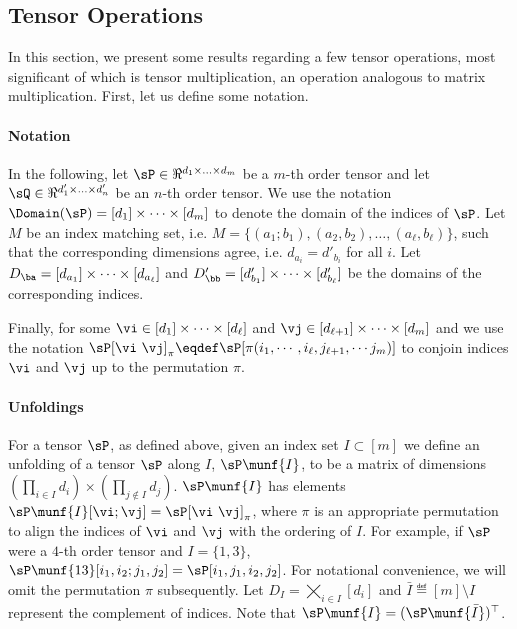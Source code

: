 \subsection{Tensor Operations}
\label{app:tensor-multiplication}

In this section, we present some results regarding a few tensor
operations, most significant of which is tensor multiplication, an
operation analogous to matrix multiplication.  
First, let us define some notation.

\paragraph{Notation}
In the following, let $\sP \in \Re^{d_1 \times \ldots \times d_m}$ be
  a $m$-th order tensor and let $\sQ \in \Re^{d'_1 \times \ldots \times
  d'_n}$ be an $n$-th order tensor. %
We use the notation $\Domain(\sP) = [d_1] \times \cdots \times [d_m]$
  to denote the domain of the indices of $\sP$.
Let $M$ be an index matching set, i.e. $M = \{ (a_1; b_1),
  (a_2, b_2), \ldots, (a_\ell, b_\ell) \}$, such that the corresponding
  dimensions agree, i.e. $d_{a_i} = d'_{b_i}$ for all $i$. Let $D_{\ba}
  = [d_{a_1}] \times \cdots \times [d_{a_\ell}]$ and $D'_{\bb}
  = [d'_{b_1}] \times \cdots \times [d'_{b_\ell}]$ be the domains of the
  corresponding indices.

Finally, for some $\vi \in [d_1] \times \cdots \times [d_\ell]$ and $\vj
\in [d_{\ell + 1}] \times \cdots \times [d_m]$ and  we use the notation
$\sP[\vi \ \vj]_\pi \eqdef \sP[\pi(i_1, \cdots, i_\ell, j_{\ell+1},
\cdots j_m)]$ to conjoin indices $\vi$ and $\vj$ up to the permutation
$\pi$. 

\paragraph{Unfoldings}
For a tensor $\sP$, as defined above, 
  given an index set $I \subset [m]$ we
  define an unfolding of a tensor $\sP$ along $I$,
 $\sP\munf{I}$, to be a matrix of dimensions $(\prod_{i \in I} d_i)
 \times (\prod_{j \not\in I} d_j)$. $\sP\munf{I}$ has elements
 $\sP\munf{I}[\vi;\vj] = \sP[\vi\ \vj]_{\pi}$, where $\pi$ is an
 appropriate permutation to align the indices of $\vi$ and $\vj$ with
 the ordering of $I$. 
For example, if $\sP$ were a $4$-th order tensor and $I = \{1,3\}$,
  $\sP\munf{13}[i_1,i_2; j_1,j_2] = \sP[i_1,j_1,i_2,j_2]$.
For notational convenience, we will omit the permutation $\pi$ subsequently.
Let $D_I = \bigtimes_{i \in I} [d_i]$ and  $\bar I \eqdef [m] \setminus
  I$ represent the complement of indices. Note that $\sP\munf{I}
  = (\sP\munf{\bar I})^\top$.

